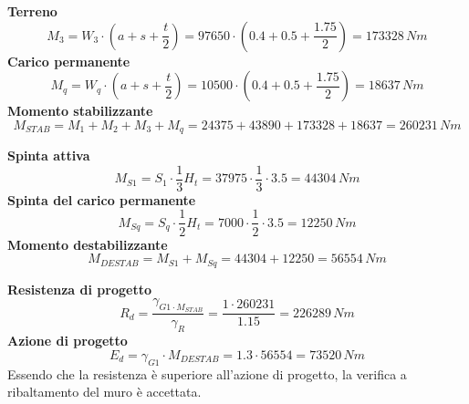 \textbf{Terreno}
\begin{equation*}
    M_3 = W_3 \cdot \left(a + s + \frac{t}{2}\right) = 97650 \cdot \left(0.4 + 0.5 + \frac{1.75}{2}\right) = 173328 \,Nm
\end{equation*}
\textbf{Carico permanente}
\begin{equation*}
    M_q = W_q \cdot \left(a + s + \frac{t}{2}\right) = 10500 \cdot \left(0.4 + 0.5 + \frac{1.75}{2}\right) = 18637 \,Nm
\end{equation*}
\textbf{Momento stabilizzante}
\begin{equation*}
    M_{STAB} = M_1 + M_2 + M_3 + M_q = 24375 + 43890 + 173328 + 18637 = 260231 \,Nm
\end{equation*}

\textbf{Spinta attiva}
\begin{equation*}
    M_{S1} = S_1 \cdot \frac{1}{3} H_t = 37975 \cdot \frac{1}{3} \cdot 3.5 = 44304\, Nm
\end{equation*}
\textbf{Spinta del carico permanente}
\begin{equation*}
    M_{Sq} = S_q \cdot \frac{1}{2} H_t = 7000 \cdot \frac{1}{2} \cdot 3.5 = 12250 \,Nm
\end{equation*}
\textbf{Momento destabilizzante}
\begin{equation*}
    M_{DESTAB} = M_{S1} + M_{Sq} = 44304 + 12250 = 56554 \,Nm
\end{equation*}

\textbf{Resistenza di progetto}
\begin{equation*}
    R_d = \frac{\gamma_{G1 \cdot M_{STAB}}}{\gamma_R} = \frac{1 \cdot 260231}{1.15} = 226289 \,Nm
\end{equation*}
\textbf{Azione di progetto}
\begin{equation*}
    E_d = \gamma_{G1} \cdot M_{DESTAB} = 1.3 \cdot 56554 = 73520 \,Nm
\end{equation*}
Essendo che la resistenza è superiore all'azione di progetto, la verifica a ribaltamento del muro è accettata.

